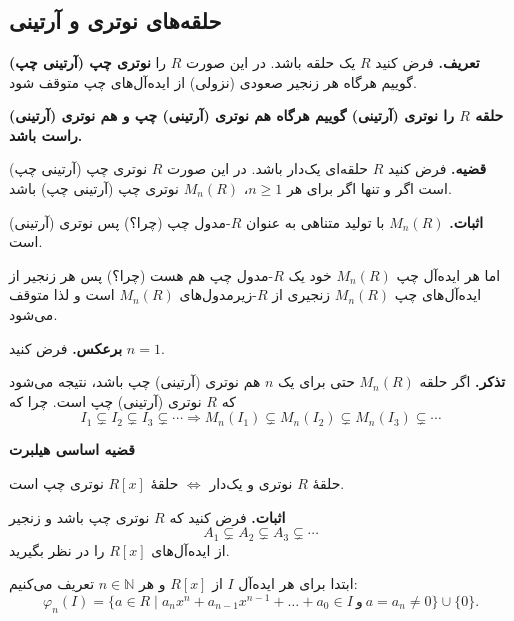 \section{}

\subsection*{حلقه‌های نوتری و آرتینی}

\textbf{تعریف.} فرض کنید $R$ یک حلقه باشد. در این صورت $R$ را \textbf{نوتری چپ (آرتینی چپ)} گوییم هرگاه هر زنجیر صعودی (نزولی) از ایده‌آل‌های چپ متوقف شود.

\textbf{حلقه $R$ را نوتری (آرتینی) گوییم هرگاه هم نوتری (آرتینی) چپ و هم نوتری (آرتینی) راست باشد.}

\textbf{قضیه.} فرض کنید $R$ حلقه‌ای یک‌دار باشد. در این صورت $R$ نوتری چپ (آرتینی چپ) است اگر و تنها اگر برای هر $n \geqslant 1$، $M_n(R)$ نوتری چپ (آرتینی چپ) باشد.

\textbf{اثبات.}
$M_n(R)$ با تولید متناهی به عنوان $R$-مدول چپ (چرا؟) پس نوتری (آرتینی) است.

اما هر ایده‌آل چپ $M_n(R)$ خود یک $R$-مدول چپ هم هست (چرا؟) پس هر زنجیر از ایده‌آل‌های چپ $M_n(R)$ زنجیری از $R$-زیرمدول‌های $M_n(R)$ است و لذا متوقف می‌شود.

\textbf{برعکس.}
فرض کنید
\(n = 1\).

\hrulefill

\textbf{تذکر.} اگر حلقه $M_n(R)$ حتی برای یک $n$ هم نوتری (آرتینی) چپ باشد،  نتیجه می‌شود که $R$ نوتری (آرتینی) چپ است. چرا که
\[
    I_1 \subsetneq I_2 \subsetneq I_3 \subsetneq \cdots \Rightarrow M_n(I_1) \subsetneq M_n(I_2) \subsetneq M_n(I_3) \subsetneq \cdots
\]


\hrulefill

\textbf{قضیه اساسی هیلبرت}

\begin{center}
    حلقهٔ $R$ نوتری و یک‌دار $\iff$ حلقهٔ $R[x]$ نوتری چپ است.
\end{center}

\textbf{اثبات.}  فرض کنید که $R$ نوتری چپ باشد و زنجیر
\[
    A_1 \subsetneq A_2 \subsetneq A_3 \subsetneq \cdots
\]
از ایده‌آل‌های $R[x]$ را در نظر بگیرید.

ابتدا برای هر ایده‌آل $I$ از $R[x]$ و هر $n \in \mathbb{N}$ تعریف می‌کنیم:
\[
    \varphi_n(I) = \{ a \in R \mid a_n x^n + a_{n-1} x^{n-1} + \dots + a_0 \in I \ \text{و} \ a = a_n \neq 0 \} \cup \{0\}.
\]

